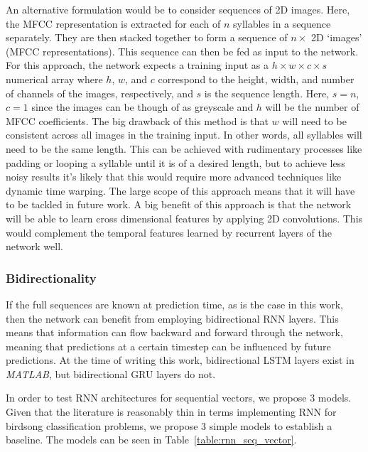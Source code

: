 An alternative formulation would be to consider sequences of 2D images.
Here, the MFCC representation is extracted for each of $n$ syllables in a
sequence separately. They are then stacked together to form a sequence of $n
\times$ 2D `images' (MFCC representations). This sequence can then be fed as
input to the network. For this approach, the network expects a training input as
a $h \times w \times c \times s$ numerical array where $h$, $w$, and $c$
correspond to the height, width, and number of channels of the images,
respectively, and $s$ is the sequence length. Here, $s=n$, $c=1$ since the
images can be though of as greyscale and $h$ will be the number of MFCC
coefficients. The big drawback of this method is that $w$ will need to be
consistent across all images in the training input. In other words, all syllables
will need to be the same length. This can be achieved with rudimentary processes
like padding or looping a syllable until it is of a desired length, but to achieve
less noisy results it's likely that this would require more advanced techniques
like dynamic time warping. The large scope of this approach means that it will
have to be tackled in future work. A big benefit of this approach is that the
network will be able to learn cross dimensional features by applying 2D
convolutions. This would complement the temporal features learned by
recurrent layers of the network well.

\subsubsection{Bidirectionality}

If the full sequences are known at prediction time, as is the case in this work,
then the network can benefit from employing bidirectional RNN layers. This means
that information can flow backward and forward through the network, meaning that
predictions at a certain timestep can be influenced by future predictions. At
the time of writing this work, bidirectional LSTM layers exist in
\textit{MATLAB}, but bidirectional GRU layers do not.

In order to test RNN architectures for sequential vectors, we propose 3 models.
Given that the literature is reasonably thin in terms implementing RNN for
birdsong classification problems, we propose 3 simple models to establish a
baseline. The models can be seen in Table~\ref{table:rnn_seq_vector}.

